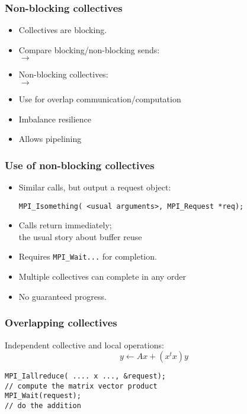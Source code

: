 \begin{mpithree}
\begin{frame}[containsverbatim]\frametitle{Non-blocking collectives}
  \label{sl:coll-nonblock-intro}
  \begin{itemize}
  \item Collectives are blocking.
  \item Compare blocking/non-blocking sends:\\
     $\rightarrow$ 
  \item Non-blocking collectives:\\
     $\rightarrow$ 
  \item Use for overlap communication/computation
  \item Imbalance resilience
  \item Allows pipelining
  \end{itemize}
\end{frame}

\begin{frame}[containsverbatim]\frametitle{Use of non-blocking collectives}
  \begin{itemize}
  \item Similar calls, but output a request object:
\begin{lstlisting}
MPI_Isomething( <usual arguments>, MPI_Request *req);
\end{lstlisting}
  \item Calls return immediately;\\
    the usual story about buffer reuse
  \item Requires \lstinline{MPI_Wait}\texttt{...} for completion.
  \item Multiple collectives can complete in any order
  \item No guaranteed progress.
  \end{itemize}
\end{frame}


\begin{frame}[containsverbatim]\frametitle{Overlapping collectives}
  Independent collective and local operations:
\[ y \leftarrow Ax + (x^tx)y \]
\begin{lstlisting}
MPI_Iallreduce( .... x ..., &request);
// compute the matrix vector product
MPI_Wait(request);
// do the addition
\end{lstlisting}
\end{frame}


\end{mpithree}
